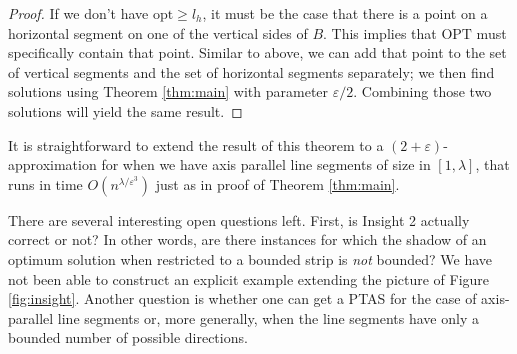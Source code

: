 \documentclass[pdflatex,sn-mathphys-num]{sn-jnl}
\theoremstyle{thmstyleone}
\newcommand{\eps}{\varepsilon}
\newcommand{\opt}{{\text{opt}}}
\newcommand{\OPT}{{\text{OPT}}}
\begin{document}
\begin{proof}
    If we don't have $ \opt \ge l_h $, it must be the case that there is a point on a horizontal segment on one of the vertical sides of $ B $. This implies that $ \OPT $ must specifically contain that point. Similar to above, we can add that point to the set of vertical segments and the set of horizontal segments separately; we then find solutions using Theorem \ref{thm:main} with parameter $ \eps/2 $. Combining those two solutions will yield the same result.
\end{proof}

It is straightforward to extend the result  of this theorem to a $(2+\eps)$-approximation for when we have axis parallel line segments of size in $[1,\lambda]$, that runs in time $O(n^{\lambda/\eps^3})$ just as in proof of Theorem \ref{thm:main}.

There are several interesting open questions left. First, is Insight 2 actually correct or not? In other words, are there instances for which the shadow of an optimum solution when restricted to a bounded strip is {\em not} bounded? We have not been able to construct an explicit example extending the picture of Figure \ref{fig:insight}.
Another question is whether one can get a PTAS for the case of axis-parallel line segments or, more generally, when the line segments have only a bounded number of possible directions.



\end{document}
